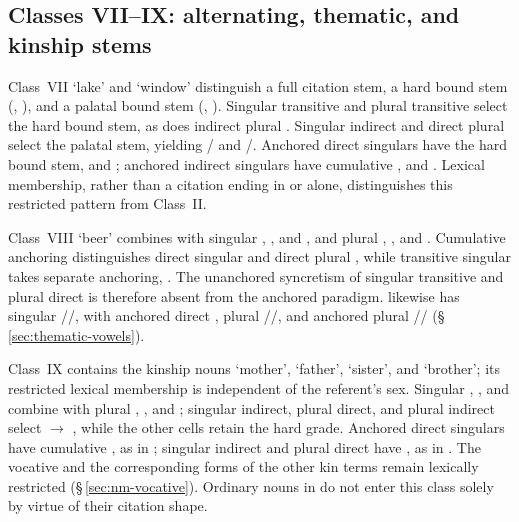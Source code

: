 \subsection{Classes VII--IX: alternating, thematic, and kinship stems}
\label{sec:nm-classes-vii-ix}

Class~VII  `lake' and  `window' distinguish a full citation
stem, a hard bound stem (, ), and a palatal bound
stem (, ). Singular transitive  and plural
transitive  select the hard bound stem, as does indirect plural
. Singular indirect  and direct plural  select
the palatal stem, yielding / and
/. Anchored direct singulars have the hard bound
stem,  and ; anchored indirect singulars have
cumulative ,  and . Lexical membership,
rather than a citation ending in  or  alone, distinguishes
this restricted pattern from Class~II.

Class~VIII  `beer' combines  with singular , ,
and , and plural , , and . Cumulative
anchoring distinguishes direct singular  and direct plural
, while transitive singular  takes separate anchoring,
. The unanchored syncretism of singular transitive and plural
direct is therefore absent from the anchored paradigm.  likewise
has singular //, with anchored direct
, plural //, and anchored plural
//
(§\,\ref{sec:thematic-vowels}).

Class~IX contains the kinship nouns  `mother',  `father',  `sister', and
 `brother'; its restricted lexical membership is
independent of the referent's sex. Singular , , and
 combine with plural , , and ;
singular indirect, plural direct, and plural indirect select 
$\rightarrow$ , while the other cells retain the hard grade.
Anchored direct singulars have cumulative , as in ;
singular indirect and plural direct have , as in .
The vocative  and the corresponding forms of the other kin terms
remain lexically restricted (§\,\ref{sec:nm-vocative}). Ordinary nouns in
 do not enter this class solely by virtue of their citation shape.


